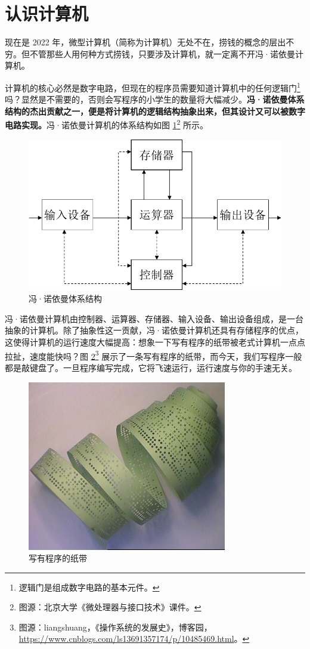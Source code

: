 
\section{认识计算机}

现在是 2022 年，微型计算机（简称为计算机）无处不在，捞钱的概念的层出不穷。但不管那些人用何种方式捞钱，只要涉及计算机，就一定离不开冯·诺依曼计算机。

计算机的核心必然是数字电路，但现在的程序员需要知道计算机中的任何逻辑门\footnote{逻辑门是组成数字电路的基本元件。}吗？显然是不需要的，否则会写程序的小学生的数量将大幅减少。\textbf{冯·诺依曼体系结构的杰出贡献之一，便是将计算机的逻辑结构抽象出来，但其设计又可以被数字电路实现。}冯·诺依曼计算机的体系结构如图 \ref{pic:logic-computer}\footnote{图源：北京大学《微处理器与接口技术》课件。} 所示。

\begin{figure}[H]
	\centering
	\includegraphics[width=0.45\linewidth]{pic/logic-computer.pdf}
	\caption{冯·诺依曼体系结构}
	\label{pic:logic-computer}
\end{figure}

冯·诺依曼计算机由控制器、运算器、存储器、输入设备、输出设备组成，是一台抽象的计算机。除了抽象性这一贡献，冯·诺依曼计算机还具有存储程序的优点，这使得计算机的运行速度大幅提高：想象一下写有程序的纸带被老式计算机一点点拉扯，速度能快吗？图 \ref{pic:paper-tape}\footnote{图源：liangshuang，《操作系统的发展史》，博客园，\url{https://www.cnblogs.com/ls13691357174/p/10485469.html}。} 展示了一条写有程序的纸带，而今天，我们写程序一般都是敲键盘了。一旦程序编写完成，它将飞速运行，运行速度与你的手速无关。

\begin{figure}[ht]
	\centering
	\includegraphics[width=0.5\linewidth]{pic/paper-tape.png}
	\caption{写有程序的纸带}
	\label{pic:paper-tape}
\end{figure}

